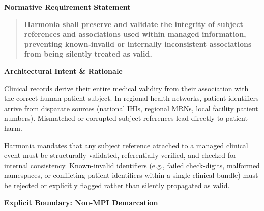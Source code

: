 \par\medskip\textbf{Normative Requirement Statement}\par


\begin{quote}


\textbf{Harmonia shall preserve and validate the integrity of subject references and associations used within managed information, preventing known-invalid or internally inconsistent associations from being silently treated as valid.}



\end{quote}


\par\medskip\textbf{Architectural Intent \& Rationale}\par


Clinical records derive their entire medical validity from their association with the correct human patient subject. In regional health networks, patient identifiers arrive from disparate sources (national IHIs, regional MRNs, local facility patient numbers). Mismatched or corrupted subject references lead directly to patient harm.



Harmonia mandates that any subject reference attached to a managed clinical event must be structurally validated, referentially verified, and checked for internal consistency. Known-invalid identifiers (e.g., failed check-digits, malformed namespaces, or conflicting patient identifiers within a single clinical bundle) must be rejected or explicitly flagged rather than silently propagated as valid.



\par\medskip\textbf{Explicit Boundary: Non-MPI Demarcation}\par


